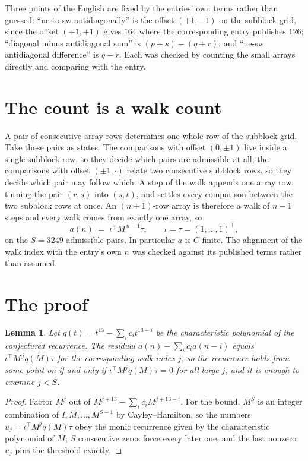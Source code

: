 \documentclass[11pt,a4paper]{article}
\theoremstyle{plain}
\newtheorem{lemma}[theorem]{Lemma}
\theoremstyle{definition}
\begin{document}
Three points of the English are fixed by the entries' own terms rather than guessed:
``ne-to-sw antidiagonally'' is the offset $(+1,-1)$ on the subblock grid, since the offset
$(+1,+1)$ gives $164$ where the corresponding entry publishes $126$; ``diagonal minus
antidiagonal sum'' is $(p+s)-(q+r)$; and ``ne-sw antidiagonal difference'' is $q-r$. Each was
checked by counting the small arrays directly and comparing with the entry.

\section{The count is a walk count}

A pair of consecutive array rows determines one whole row of the subblock grid. Take those
pairs as states. The comparisons with offset $(0,\pm1)$ live inside a single subblock row, so
they decide which pairs are admissible at all; the comparisons with offset $(\pm1,\cdot)$
relate two consecutive subblock rows, so they decide which pair may follow which. A step of the
walk appends one array row, turning the pair $(r,s)$ into $(s,t)$, and settles every comparison
between the two subblock rows at once. An $(n+1)$-row array is therefore a walk of $n-1$ steps
and every walk comes from exactly one array, so
\[
a(n)\;=\;\iota^{\!\top}M^{\,n-1}\tau,\qquad \iota=\tau=(1,\dots,1)^{\!\top},
\]
on the $S=3249$ admissible pairs. In particular $a$ is $C$-finite. The alignment of the walk
index with the entry's own $n$ was checked against its published terms rather than assumed.

\section{The proof}

\begin{lemma}\label{lem:crit}
Let $q(t)=t^{13}-\sum_i c_it^{13-i}$ be the characteristic polynomial of the
conjectured recurrence. The residual $a(n)-\sum_ic_ia(n-i)$ equals
$\iota^{\!\top}M^{\,j}q(M)\tau$ for the corresponding walk index $j$, so the recurrence
holds from some point on if and only if $\iota^{\!\top}M^{j}q(M)\tau=0$ for all large $j$,
and it is enough to examine $j<S$.
\end{lemma}

\begin{proof}
Factor $M^{j}$ out of $M^{j+13}-\sum_ic_iM^{j+13-i}$. For the bound, $M^{S}$
is an integer combination of $I,M,\dots,M^{S-1}$ by Cayley--Hamilton, so the numbers
$u_j=\iota^{\!\top}M^{j}q(M)\tau$ obey the monic recurrence given by the characteristic
polynomial of $M$; $S$ consecutive zeros force every later one, and the last nonzero $u_j$
pins the threshold exactly.
\end{proof}
\end{document}
